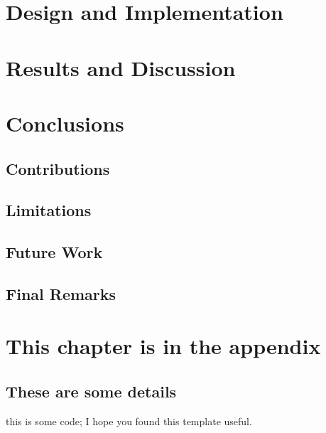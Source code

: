 \documentclass[12pt, a4paper]{report}
\newenvironment{code}
{\footnotesize\verbatim}{\endverbatim\normalfont}
\theoremstyle{definition}
\theoremstyle{definition}%
\theoremstyle{definition}%
\theoremstyle{definition}%
\theoremstyle{definition}%
\theoremstyle{definition}%
\begin{document}
	
\chapter{Design and Implementation}



\chapter{Results and Discussion}
	


\chapter{Conclusions}

	\section{Contributions}
	
	\section{Limitations}
	
	\section{Future Work}
	
	\section{Final Remarks}


\appendix

\chapter{This chapter is in the appendix}
\section{These are some details}
\begin{code}
this is some code;
I hope you found this template useful.
\end{code}


\bibliomatter




 
 
\end{document}
